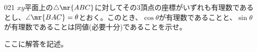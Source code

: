 \begin{thm}{021}{}{}
 $xy$平面上の$\triangle\mr{ABC}$に対してその3頂点の座標がいずれも有理数であるとし、$\angle\mr{BAC}=\theta$とおく。このとき、$\cos\theta$が有理数であることと、$\sin\theta$が有理数であることは同値(必要十分)であることを示せ。
\end{thm}

ここに解答を記述。